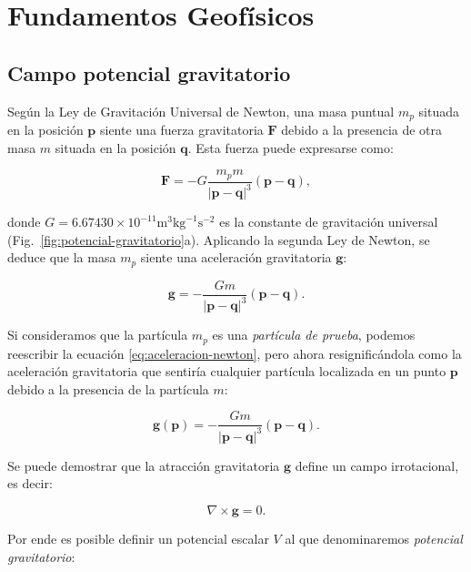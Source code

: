 \chapter{Fundamentos Geofísicos}

\section{Campo potencial gravitatorio}

Según la Ley de Gravitación Universal de Newton, una masa puntual $m_p$ situada
en la posición $\mathbf{p}$ siente una fuerza gravitatoria $\mathbf{F}$ debido
a la presencia de otra masa $m$ situada en la posición $\mathbf{q}$. Esta
fuerza puede expresarse como:

\begin{equation}
    \mathbf{F} =
        - G \frac{m_p m}{|\mathbf{p} - \mathbf{q}|^3} (\mathbf{p} - \mathbf{q}),
\end{equation}

\noindent donde $G = 6.67430 \times 10^{-11} \text{m}^3 \text{kg}^{-1}
\text{s}^{-2}$ es la constante de gravitación universal
(Fig.~\ref{fig:potencial-gravitatorio}a).
Aplicando la segunda Ley de Newton, se deduce que la masa $m_p$ siente una
aceleración gravitatoria $\mathbf{g}$:

\begin{equation}
    \mathbf{g} =
        - \frac{G m}{|\mathbf{p} - \mathbf{q}|^3} (\mathbf{p} - \mathbf{q}).
    \label{eq:aceleracion-newton}
\end{equation}

Si consideramos que la partícula $m_p$ es una \emph{partícula de prueba},
podemos reescribir la ecuación \ref{eq:aceleracion-newton}, pero ahora
resignificándola como la aceleración gravitatoria que sentiría cualquier
partícula localizada en un punto $\mathbf{p}$ debido a la presencia de la
partícula $m$:

\begin{equation}
    \mathbf{g}(\mathbf{p}) =
        - \frac{G m}{|\mathbf{p} - \mathbf{q}|^3} (\mathbf{p} - \mathbf{q}).
\end{equation}

Se puede demostrar que la atracción gravitatoria $\mathbf{g}$ define un campo
irrotacional, es decir:

\begin{equation}
    \nabla \times \mathbf{g} = 0.
\end{equation}

\noindent Por ende es posible definir un potencial escalar $V$ al que
denominaremos \emph{potencial gravitatorio}:

